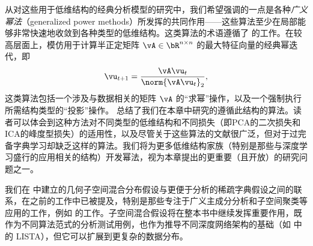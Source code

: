 \documentclass[../../book-main_zh.tex]{subfiles}
\begin{document}
\begin{table}[tb]
    \centering
    \caption{本章介绍的（广义）幂法总结}
    \label{tab:power-method-summary}
\end{table}

从对这些用于低维结构的经典分析模型的研究中，我们希望强调的一点是各种\textit{广义幂法}（generalized power
methods）所发挥的共同作用——这些算法至少在局部能够非常快速地收敛到各种类型的低维结构。这类算法的术语遵循了
\textcite{JourneeM2010} 的工作。在较高层面上，模仿用于计算半正定矩阵 $\vA \in \bR^{n \times
n}$ 的最大特征向量的经典幂迭代，即
\begin{equation}
    \vu_{t+1} = \frac{\vA \vu_{t}}{\norm{\vA \vu_{t}}_2},
\end{equation}
这类算法包括一个涉及与数据相关的矩阵 $\vA$
的“求幂”操作，以及一个强制执行所需结构类型的“投影”操作。
总结了我们在本章中研究的遵循此结构的算法。读者可以体会到这种方法对不同类型的低维结构和不同损失（即PCA的二次损失和ICA的峰度型损失）的适用性，以及尽管关于这些算法的文献很广泛，但对于过完备字典学习却缺乏这样的算法。我们将为更多低维结构家族（特别是那些与深度学习盛行的应用相关的结构）开发幂法，视为本章提出的更重要（且开放）的研究问题之一。

我们在 
中建立的几何子空间混合分布假设与更便于分析的稀疏字典假设之间的联系，在之前的工作中已被提及，特别是那些专注于广义主成分分析和子空间聚类等应用的工作，例如
\textcite{GPCA}
的工作。子空间混合假设将在整本书中继续发挥重要作用，既作为不同算法范式的分析测试用例，也作为推导不同深度网络架构的基础（如
 中的 LISTA），但它可以扩展到更复杂的数据分布。
\end{document}

